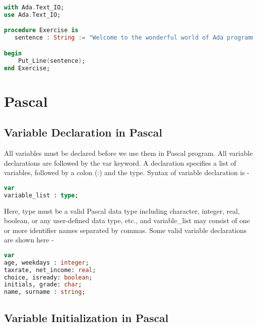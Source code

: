 \documentclass[12pt]{book}
\begin{document}
\lstset{style=mystyle}
\begin{lstlisting}[language=Ada, caption=Ada example]
with Ada.Text_IO;
use Ada.Text_IO;

procedure Exercise is
   sentence : String := "Welcome to the wonderful world of Ada programming!";

begin
    Put_Line(sentence);
end Exercise;
\end{lstlisting}



\newpage

\section{Pascal}

\subsection{Variable Declaration in Pascal}

All variables must be declared before we use them in Pascal program. All variable declarations are followed by the var keyword. A declaration specifies a list of variables, followed by a colon (:) and the type. Syntax of variable declaration is -



\lstset{style=mystyle}
\begin{lstlisting}[language=Pascal, caption=Pascal example]
var
variable_list : type;
\end{lstlisting}



Here, type must be a valid Pascal data type including character, integer, real, boolean, or any user-defined data type, etc., and variable\_list may consist of one or more identifier names separated by commas. Some valid variable declarations are shown here - 




\lstset{style=mystyle}
\begin{lstlisting}[language=Pascal, caption=Pascal example]
var
age, weekdays : integer;
taxrate, net_income: real;
choice, isready: boolean;
initials, grade: char;
name, surname : string;
\end{lstlisting}



\subsection{Variable Initialization in Pascal}
\end{document}
